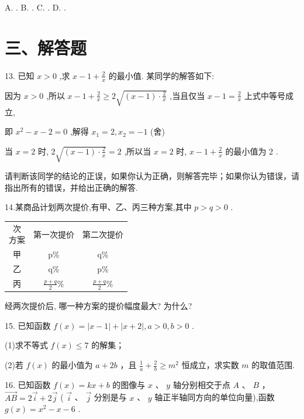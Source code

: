 A.     . B.     . C.       . D.     .

\section*{三、解答题}

13. 已知 $x > 0$ ,求 $x - 1 + \frac{2}{x}$ 的最小值. 某同学的解答如下:

因为 $x > 0$ ,所以 $x - 1 + \frac{2}{x} \geq  2\sqrt{\left( {x - 1}\right)  \cdot  \frac{2}{x}}$ ,当且仅当 $x - 1 = \frac{2}{x}$ 上式中等号成立,

即 ${x}^{2} - x - 2 = 0$ ,解得 ${x}_{1} = 2,{x}_{2} =  - 1$ (舍)

当 $x = 2$ 时, $2\sqrt{\left( {x - 1}\right)  \cdot  \frac{2}{x}} = 2$ ,所以当 $x = 2$ 时, $x - 1 + \frac{2}{x}$ 的最小值为 2 .

请判断该同学的结论的正误，如果你认为正确，则解答完毕；如果你认为错误，请指出所有的错误，并给出正确的解答.

14.某商品计划两次提价,有甲、乙、丙三种方案,其中 $p > q > 0$ .

\begin{center}
\begin{tabular}{|c|c|c|}
\hline
\makecell{ 次 \\ 方案 } & 第一次提价 & 第二次提价 \\
\cline{1-3}
甲 & p\% & q\% \\
\cline{1-3}
乙 & q\% & p\% \\
\cline{1-3}
丙 & $\frac{p + q}{2}\%$ & $\frac{p + q}{2}\%$ \\
\cline{1-3}
\hline
\end{tabular}
\end{center}

经两次提价后, 哪一种方案的提价幅度最大? 为什么?

15. 已知函数 $f\left( x\right)  = \left| {x - 1}\right|  + \left| {x + 2}\right| ,a > 0,b > 0$ .

(1)求不等式 $f\left( x\right)  \leq  7$ 的解集；

(2)若 $f\left( x\right)$ 的最小值为 $a + {2b}$ ，且 $\frac{1}{a} + \frac{2}{b} \geq  {m}^{2}$ 恒成立，求实数 $m$ 的取值范围.

16. 已知函数 $f\left( x\right)  = {kx} + b$ 的图像与 $x$ 、 $y$ 轴分别相交于点 $A$ 、 $B$ ， $\overrightarrow{AB} = 2\overrightarrow{i} + 2\overrightarrow{j}$ ( $\overrightarrow{i}$ 、 $\overrightarrow{j}$ 分别是与 $x$ 、 $y$ 轴正半轴同方向的单位向量),函数 $g\left( x\right)  = {x}^{2} - x - 6$ .

